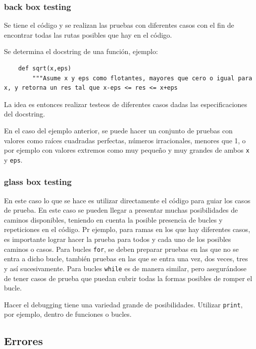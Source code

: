 \subsubsection{back box testing}

Se tiene el código y se realizan las pruebas con diferentes casos con el fin de encontrar todas las rutas posibles que hay en el código.

Se determina el docstring de una función, ejemplo: \\

\begin{verbatim}
    def sqrt(x,eps)
        """Asume x y eps como flotantes, mayores que cero o igual para x, y retorna un res tal que x-eps <= res <= x+eps
\end{verbatim}

La idea es entonces realizar testeos de diferentes casos dadas las especificaciones del docstring. 

En el caso del ejemplo anterior, se puede hacer un conjunto de pruebas con valores como raíces cuadradas perfectas, números irracionales, menores que 1, o por ejemplo con valores extremos como muy pequeño y muy grandes de ambos \texttt{x} y \texttt{eps}.

\subsubsection{glass box testing}

En este caso lo que se hace es utilizar directamente el código para guiar los casos de prueba. En este caso se pueden llegar a presentar muchas posibilidades de caminos disponibles, teniendo en cuenta la posible presencia de bucles y repeticiones en el código.
Pr ejemplo, para ramas en los que hay diferentes casos, es importante lograr hacer la prueba para todos y cada uno de los posibles caminos o casos. Para bucles \texttt{for}, se deben preparar pruebas en las que no se entra a dicho bucle, también pruebas en las que se entra una vez, dos veces, tres y así sucesivamente. Para bucles \texttt{while} es de manera similar, pero asegurándose de tener casos de prueba que puedan cubrir todas la formas posibles de romper el bucle.

Hacer el debugging tiene una variedad grande de posibilidades. Utilizar \texttt{print}, por ejemplo, dentro de funciones o bucles.

\subsection{Errores}

